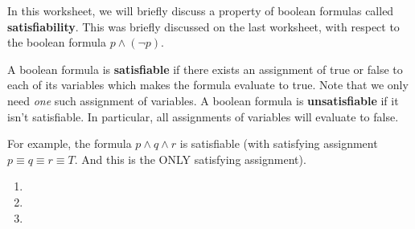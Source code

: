 In this worksheet, we will briefly discuss a property of boolean formulas called \textbf{satisfiability}. This was briefly discussed on the last worksheet, with respect to the boolean formula $p \land (\lnot p)$.

\begin{tcolorbox}
 A boolean formula is \textbf{satisfiable} if there exists an assignment of true or false to each of its variables which makes the formula evaluate to true. Note that we only need \textit{one} such assignment of variables.
 A boolean formula is \textbf{unsatisfiable} if it isn't satisfiable. In particular, all assignments of variables will evaluate to false.
\end{tcolorbox}

For example, the formula $p \land q \land r$ is satisfiable (with satisfying assignment $p \equiv q \equiv r \equiv T$. And this is the ONLY satisfying assignment).
 \begin{enumerate}
   \item 
   \item 
   \item 
 \end{enumerate}

